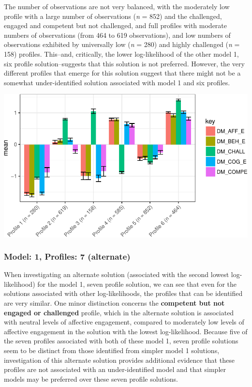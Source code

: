 \documentclass[]{book}
\theoremstyle{definition}
\theoremstyle{definition}
\theoremstyle{definition}
\theoremstyle{remark}
\begin{document}
The number of observations are not very balanced, with the moderately
low profile with a large number of observations (\emph{n} = 852) and the
challenged, engaged and competent but not challenged, and full profiles
with moderate numbers of observations (from 464 to 619 observations),
and low numbers of observations exhibited by universally low (\emph{n} =
280) and highly challenged (\emph{n} = 158) profiles. This--and,
critically, the lower log-likelihood of the other model 1, six profile
solution--suggests that this solution is not preferred. However, the
very different profiles that emerge for this solution suggest that there
might not be a somewhat under-identified solution associated with model
1 and six profiles.

\begin{center}\includegraphics[width=0.8\linewidth]{rosenberg-dissertation_files/figure-latex/m1_6p-alt-1} \end{center}

\subsubsection{Model: 1, Profiles: 7
(alternate)}\label{model-1-profiles-7-alternate}

When investigating an alternate solution (associated with the second
lowest log-likelihood) for the model 1, seven profile solution, we can
see that even for the solutions associated with other log-likelihoods,
the profiles that can be identified are very similar. One minor
distinction concerns the \textbf{competent but not engaged or
challenged} profile, which in the alternate solution is associated with
neutral levels of affective engagement, compared to moderately low
levels of affective engagement in the solution with the lowest
log-likelihood. Because five of the seven profiles associated with both
of these model 1, seven profile solutions seem to be distinct from those
identified from simpler model 1 solutions, investigation of this
alternate solution provides additional evidence that these profiles are
not associated with an under-identified model and that simpler models
may be preferred over these seven profile solutions.
\end{document}
